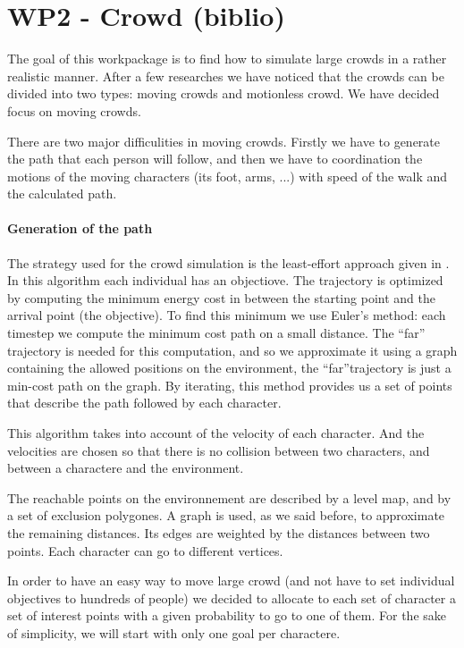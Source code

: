 \section{WP2 - Crowd (biblio)}

The goal of this workpackage is to find how to simulate large crowds in a rather realistic manner. After a few researches we have noticed that the crowds can be divided into two types: moving crowds and motionless crowd. We have decided focus on moving crowds. 

There are two major difficulities in moving crowds. Firstly we have to generate the path that each person will follow, and then we have to coordination the motions of the moving characters (its foot, arms, ...) with speed of the walk and the calculated path.

\paragraph{Generation of the path}

The strategy used for the crowd simulation is the least-effort approach given in \cite{PLE}.\\
In this algorithm each individual has an objectiove. The trajectory is optimized by computing the minimum energy cost in between the starting point and the arrival point (the objective). To find this minimum we use Euler's method: each timestep we compute the minimum cost path on a small distance. The ``far'' trajectory is needed for this computation, and so we approximate it using a graph containing the allowed positions on the environment, the ``far''trajectory is just a min-cost path on the graph. By iterating, this method provides us a set of points that describe the path followed by each character.

This algorithm takes into account of the velocity of each character. And the velocities are chosen so that there is no collision between two characters, and between a charactere and the environment.

The reachable points on the environnement are described by a level map, and by a set of exclusion polygones. A graph is used, as we said before, to approximate the remaining distances. Its edges are weighted by the distances between two points. Each character can go to different vertices.

In order to have an easy way to move large crowd (and not have to set individual objectives to hundreds of people) we decided to allocate to each set of character a set of interest points with a given probability to go to one of them. For the sake of simplicity, we will start with only one goal per charactere.


